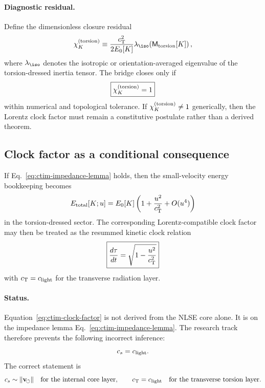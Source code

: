 \paragraph{Diagnostic residual.}
Define the dimensionless closure residual
\begin{equation}
    \chi_K^{(\torsion)}
    \equiv
    \frac{\ct^2}{2E_0[K]}
    \lambda_{\iso}\!\left(\mathsf M_{\torsion}[K]\right),
    \label{eq:ctim-chi}
\end{equation}
where \(\lambda_{\iso}\) denotes the isotropic or orientation-averaged eigenvalue of the torsion-dressed inertia tensor.  The bridge closes only if
\begin{equation}
    \boxed{\chi_K^{(\mathrm{torsion})}=1}
    \label{eq:ctim-chi-one}
\end{equation}
within numerical and topological tolerance.  If \(\chi_K^{(\mathrm{torsion})}\neq1\) generically, then the Lorentz clock factor must remain a constitutive postulate rather than a derived theorem.

\subsection{Clock factor as a conditional consequence}
\label{subsec:ctim-clock-consequence}

If Eq.~\eqref{eq:ctim-impedance-lemma} holds, then the small-velocity energy bookkeeping becomes
\begin{equation}
    E_{\mathrm{total}}[K;u]
    =
    E_0[K]
    \left(1+\frac{u^2}{c_{\mathrm{T}}^2}+O(u^4)\right)
\end{equation}
in the torsion-dressed sector.  The corresponding Lorentz-compatible clock factor may then be treated as the resummed kinetic clock relation
\begin{equation}
    \boxed{
    \frac{d\tau}{dt}
    =
    \sqrt{1-\frac{u^2}{c_{\mathrm{T}}^2}}
    }
    \label{eq:ctim-clock-factor}
\end{equation}
with \(c_{\mathrm{T}}=c_{\mathrm{light}}\) for the transverse radiation layer.

\paragraph{Status.}
Equation~\eqref{eq:ctim-clock-factor} is not derived from the NLSE core alone.  It is  on the impedance lemma Eq.~\eqref{eq:ctim-impedance-lemma}.  The research track therefore prevents the following incorrect inference:
\begin{equation}
    c_s=c_{\mathrm{light}}.
\end{equation}
The correct statement is
\begin{equation}
    c_s\sim\lVert\mathbf{v}_{\!\boldsymbol{\circlearrowleft}}\rVert
    \quad\text{for the internal core layer},
    \qquad
    c_{\mathrm{T}}=c_{\mathrm{light}}
    \quad\text{for the transverse torsion layer}.
\end{equation}

